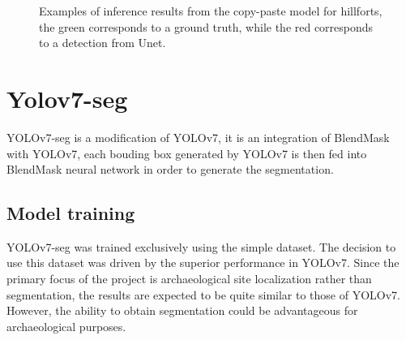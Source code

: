 \begin{figure}[H]
    \centering
    \qquad
    \caption{Examples of inference results from the copy-paste model for hillforts, the green corresponds to a ground truth, while the red corresponds to a detection from Unet.}%
\end{figure}


\section{Yolov7-seg}
YOLOv7-seg is a modification of YOLOv7, it is an integration of BlendMask with YOLOv7, each bouding box generated by YOLOv7 is then fed into BlendMask neural network in order to generate the segmentation.

\subsection{Model training}

YOLOv7-seg was trained exclusively using the simple dataset. The decision to use this dataset was driven by the superior performance in YOLOv7. Since the primary focus of the project is archaeological site localization rather than segmentation, the results are expected to be quite similar to those of YOLOv7. However, the ability to obtain segmentation could be advantageous for archaeological purposes.


